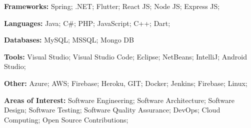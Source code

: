 

\begin{cventries}

  \cventryTec
  {
    \begin{cvitems} %
      \item {\textbf{Frameworks:} Spring; .NET; Flutter; React JS; Node JS; Express JS;}
      \item {\textbf{Languages:} Java; C\#; PHP; JavaScript; C++; Dart;}
      \item {\textbf{Databases:} MySQL; MSSQL; Mongo DB}
      \item {\textbf{Tools:} Visual Studio; Visual Studio Code; Eclipse; NetBeans; IntelliJ; Android Studio;}
      \item {\textbf{Other:} Azure; AWS; Firebase; Heroku, GIT; Docker; Jenkins; Firebase; Linux;}
      \item {\textbf{Areas of Interest:} Software Engineering; Software Architecture; Software Design; Software Testing; Software Quality Assurance; DevOps; Cloud Computing; Open Source Contributions;}
    \end{cvitems}
  }



\end{cventries}
